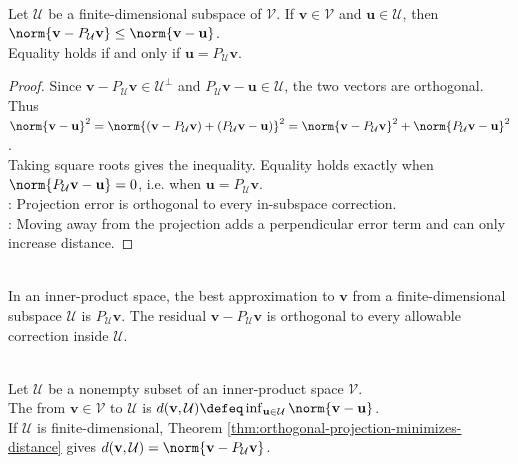\begin{theorem} \label{thm:orthogonal-projection-minimizes-distance} \\
Let $\mathcal{U}$ be a finite-dimensional subspace of $\mathcal{V}$. If $\mathbf{v}\in\mathcal{V}$ and $\mathbf{u}\in\mathcal{U}$, then $\norm{\mathbf{v}-P_{\mathcal{U}}\mathbf{v}}\leq\norm{\mathbf{v}-\mathbf{u}}$.\\
Equality holds if and only if $\mathbf{u}=P_{\mathcal{U}}\mathbf{v}$.
\begin{proof}
Since $\mathbf{v}-P_{\mathcal{U}}\mathbf{v}\in\mathcal{U}^{\perp}$ and $P_{\mathcal{U}}\mathbf{v}-\mathbf{u}\in\mathcal{U}$, the two vectors are orthogonal.\\
Thus $\norm{\mathbf{v}-\mathbf{u}}^2 =\norm{(\mathbf{v}-P_{\mathcal{U}}\mathbf{v})+(P_{\mathcal{U}}\mathbf{v}-\mathbf{u})}^2 =\norm{\mathbf{v}-P_{\mathcal{U}}\mathbf{v}}^2+\norm{P_{\mathcal{U}}\mathbf{v}-\mathbf{u}}^2$.\\
Taking square roots gives the inequality. Equality holds exactly when $\norm{P_{\mathcal{U}}\mathbf{v}-\mathbf{u}}=0$, i.e. when $\mathbf{u}=P_{\mathcal{U}}\mathbf{v}$.\\
: Projection error is orthogonal to every in-subspace correction.\\
: Moving away from the projection adds a perpendicular error term and can only increase distance.
\end{proof}
\end{theorem}

\begin{principle} \label{pri:least-squares-projection-principle} \\
In an inner-product space, the best approximation to $\mathbf{v}$ from a finite-dimensional subspace $\mathcal{U}$ is $P_{\mathcal{U}}\mathbf{v}$. The residual $\mathbf{v}-P_{\mathcal{U}}\mathbf{v}$ is orthogonal to every allowable correction inside $\mathcal{U}$.
\end{principle}

\begin{definition} \label{def:distance-to-subspace} \\
Let $\mathcal{U}$ be a nonempty subset of an inner-product space $\mathcal{V}$.\\
The  from $\mathbf{v}\in\mathcal{V}$ to $\mathcal{U}$ is $d(\mathbf{v},\mathcal{U})\defeq \inf_{\mathbf{u}\in\mathcal{U}}\norm{\mathbf{v}-\mathbf{u}}$.\\
If $\mathcal{U}$ is finite-dimensional, Theorem \ref{thm:orthogonal-projection-minimizes-distance} gives $d(\mathbf{v},\mathcal{U})=\norm{\mathbf{v}-P_{\mathcal{U}}\mathbf{v}}$.
\end{definition}

